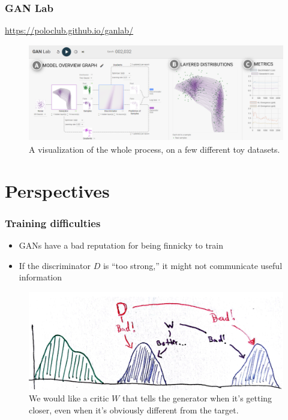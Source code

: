 \documentclass[10pt,mathserif]{beamer}
\begin{document}
\begin{frame}
  \frametitle{GAN Lab}
  \url{https://poloclub.github.io/ganlab/}
  \begin{figure}[ht]
    \centering
    \includegraphics[width=0.7\paperwidth]{figure/ganlab}
    \caption{A visualization of the whole process, on a few different toy
      datasets. \label{fig:ganlab} }
  \end{figure}
\end{frame}

\section{Perspectives}
\label{sec:perspectives}

\begin{frame}
  \frametitle{Training difficulties}
 \begin{itemize}
 \item GANs have a bad reputation for being finnicky to train
 \item If the discriminator $D$ is ``too strong,'' it might not communicate
   useful information
 \end{itemize}
\begin{figure}[ht]
  \centering
  \includegraphics[width=0.7\paperwidth]{figure/alternative_critic}
  \caption{We would like a critic $W$ that tells the generator when it's getting
    closer, even when it's obviously different from the
    target. \label{fig:alternative_critic} }
\end{figure}
\end{frame}
\end{document}
